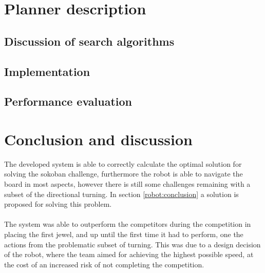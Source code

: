 \documentclass[final, english, a4paper]{article}
\begin{document}
\section{Planner description}
    
	\subsection{Discussion of search algorithms} %
		
	\subsection{Implementation}
	
	\subsection{Performance evaluation}
	
\section{Conclusion and discussion}    
    The developed system is able to correctly calculate the optimal solution for solving
    the sokoban challenge, furthermore the robot is able to navigate the board in most
    aspects, however there is still some challenges remaining with a subset of the directional turning.
    In section \ref{robot:conclusion} a solution is proposed for solving this problem.\\
    \\
    The system was able to outperform the competitors during the competition in
    placing the first jewel, and up until the first time it had to perform,
    one the actions from the problematic subset of turning.
    This was due to a design decision of the robot, where the team aimed for 
    achieving the highest possible speed, at the cost of an increased risk of
    not completing the competition.
    \\\\
%
%
\end{document}
